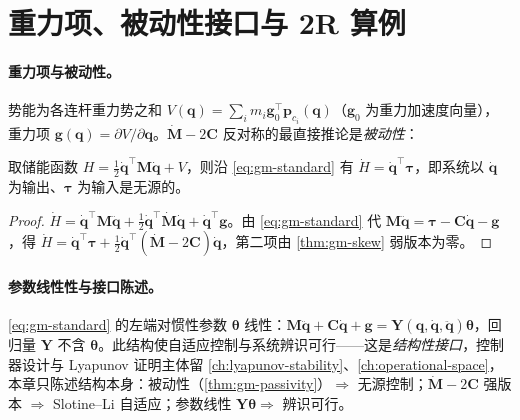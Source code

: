 \section{重力项、被动性接口与 2R 算例}
\label{sec:gm-gravity}

\paragraph{重力项与被动性。}
势能为各连杆重力势之和 $V(\mathbf q)=\sum_i m_i\mathbf g_0^\top\mathbf p_{c_i}(\mathbf q)$（$\mathbf g_0$ 为重力加速度向量），重力项 $\mathbf g(\mathbf q)=\partial V/\partial\mathbf q$。$\dot{\mathbf M}-2\mathbf C$ 反对称的最直接推论是\emph{被动性}：

\begin{theorem}[被动性]\label{thm:gm-passivity}
取储能函数 $H=\tfrac12\dot{\mathbf q}^\top\mathbf M\dot{\mathbf q}+V$，则沿 \cref{eq:gm-standard} 有 $\dot H=\dot{\mathbf q}^\top\boldsymbol\tau$，即系统以 $\dot{\mathbf q}$ 为输出、$\boldsymbol\tau$ 为输入是无源的。
\end{theorem}

\begin{proof}
$\dot H=\dot{\mathbf q}^\top\mathbf M\ddot{\mathbf q}+\tfrac12\dot{\mathbf q}^\top\dot{\mathbf M}\dot{\mathbf q}+\dot{\mathbf q}^\top\mathbf g$。由 \cref{eq:gm-standard} 代 $\mathbf M\ddot{\mathbf q}=\boldsymbol\tau-\mathbf C\dot{\mathbf q}-\mathbf g$，得 $\dot H=\dot{\mathbf q}^\top\boldsymbol\tau+\tfrac12\dot{\mathbf q}^\top(\dot{\mathbf M}-2\mathbf C)\dot{\mathbf q}$，第二项由 \cref{thm:gm-skew} 弱版本为零。
\end{proof}

\paragraph{参数线性性与接口陈述。}
\cref{eq:gm-standard} 的左端对惯性参数 $\boldsymbol\theta$ 线性：$\mathbf M\ddot{\mathbf q}+\mathbf C\dot{\mathbf q}+\mathbf g=\mathbf Y(\mathbf q,\dot{\mathbf q},\ddot{\mathbf q})\boldsymbol\theta$，回归量 $\mathbf Y$ 不含 $\boldsymbol\theta$。此结构使自适应控制与系统辨识可行——这是\emph{结构性接口}，控制器设计与 Lyapunov 证明主体留 \cref{ch:lyapunov-stability}、\cref{ch:operational-space}，本章只陈述结构本身：被动性（\cref{thm:gm-passivity}）$\Rightarrow$ 无源控制；$\dot{\mathbf M}-2\mathbf C$ 强版本 $\Rightarrow$ Slotine--Li 自适应；参数线性 $\mathbf Y\boldsymbol\theta\Rightarrow$ 辨识可行。

